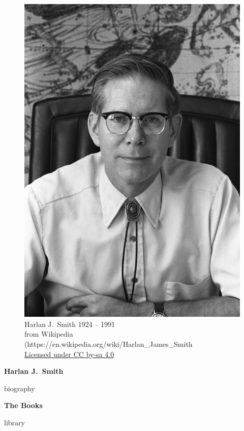 \documentclass[letterpaper]{book}
\begin{document}
\thispagestyle{empty}
\begin{figure}[t]
  \centering
  \includegraphics{hjs_photo.jpg} \\
  Harlan J.~Smith 1924 -- 1991 \\
  {\scriptsize from Wikipedia
    (https://en.wikipedia.org/wiki/Harlan\_James\_Smith \\
    \href{https://creativecommons.org/licenses/by-sa/4.0}{Licensed under CC by-sa 4.0}}
  \label{fig:hjs}
\end{figure}
\clearpage

\pagestyle{plain}
\vspace*{1 in}
\centerline{\Large \bf Harlan J.\ Smith}
\bigskip\bigskip
{biography}
\newpage

\vspace*{1 in}
\centerline{\Large \bf The Books}
\bigskip\bigskip
{library}
\newpage
\end{document}
